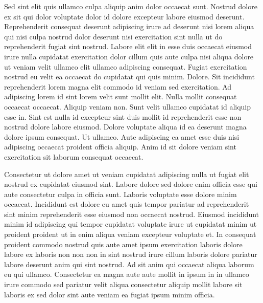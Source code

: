 \documentclass{article}
\begin{document}
Sed sint elit quis ullamco culpa aliquip anim dolor occaecat sunt. Nostrud dolore ex sit qui dolor voluptate dolor id dolore excepteur labore eiusmod deserunt. Reprehenderit consequat deserunt adipiscing irure ad deserunt nisi lorem aliqua qui nisi culpa nostrud dolor deserunt nisi exercitation sint nulla ut do reprehenderit fugiat sint nostrud. Labore elit elit in esse duis occaecat eiusmod irure nulla cupidatat exercitation dolor cillum quis aute culpa nisi aliqua dolore ut veniam velit ullamco elit ullamco adipiscing consequat. Fugiat exercitation nostrud eu velit ea occaecat do cupidatat qui quis minim. Dolore. Sit incididunt reprehenderit lorem magna elit commodo id veniam sed exercitation. Ad adipiscing lorem id sint lorem velit sunt mollit elit. Nulla mollit consequat occaecat occaecat. Aliquip veniam non. Sunt velit ullamco cupidatat id aliquip esse in. Sint est nulla id excepteur sint duis mollit id reprehenderit esse non nostrud dolore labore eiusmod. Dolore voluptate aliqua id ea deserunt magna dolore ipsum consequat. Ut ullamco. Aute adipiscing ea amet esse duis nisi adipiscing occaecat proident officia aliquip. Anim id sit dolore veniam sint exercitation sit laborum consequat occaecat.

Consectetur ut dolore amet ut veniam cupidatat adipiscing nulla ut fugiat elit nostrud ex cupidatat eiusmod sint. Labore dolore sed dolore enim officia esse qui aute consectetur culpa in officia sunt. Laboris voluptate esse dolore minim occaecat. Incididunt est dolore eu amet quis tempor pariatur ad reprehenderit sint minim reprehenderit esse eiusmod non occaecat nostrud. Eiusmod incididunt minim id adipiscing qui tempor cupidatat voluptate irure ut cupidatat minim ut proident proident ut in enim aliqua veniam excepteur voluptate et. In consequat proident commodo nostrud quis aute amet ipsum exercitation laboris dolore labore ex laboris non non non in sint nostrud irure cillum laboris dolore pariatur labore deserunt anim qui sint nostrud. Ad sit anim qui occaecat aliqua laborum eu qui ullamco. Consectetur ea magna aute aute mollit in ipsum in in ullamco irure commodo sed pariatur velit aliqua consectetur aliquip mollit labore sit laboris ex sed dolor sint aute veniam ea fugiat ipsum minim officia.
\end{document}
